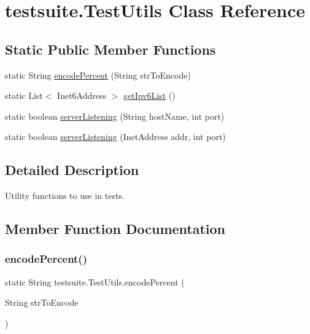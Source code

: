 \hypertarget{classtestsuite_1_1_test_utils}{}\section{testsuite.\+Test\+Utils Class Reference}
\label{classtestsuite_1_1_test_utils}
\subsection*{Static Public Member Functions}
\begin{DoxyCompactItemize}
\item 
static String \mbox{\hyperlink{classtestsuite_1_1_test_utils_aa56c16bde9485cf06427278716fc80f0}{encode\+Percent}} (String str\+To\+Encode)
\item 
static List$<$ Inet6\+Address $>$ \mbox{\hyperlink{classtestsuite_1_1_test_utils_a7b4afe11135792d356ef72338be74054}{get\+Ipv6\+List}} ()
\item 
static boolean \mbox{\hyperlink{classtestsuite_1_1_test_utils_a6a23cc4c25f5ec50a93d7735d8591f74}{server\+Listening}} (String host\+Name, int port)
\item 
static boolean \mbox{\hyperlink{classtestsuite_1_1_test_utils_a12975c2246ae1be20b9352ad1cff9460}{server\+Listening}} (Inet\+Address addr, int port)
\end{DoxyCompactItemize}


\subsection{Detailed Description}
Utility functions to use in tests. 

\subsection{Member Function Documentation}
\mbox{\label{classtestsuite_1_1_test_utils_aa56c16bde9485cf06427278716fc80f0}} 
\subsubsection{\texorpdfstring{encode\+Percent()}{encodePercent()}}
{\footnotesize\ttfamily static String testsuite.\+Test\+Utils.\+encode\+Percent (\begin{DoxyParamCaption}\item[{String}]{str\+To\+Encode }\end{DoxyParamCaption})\hspace{0.3cm}{\ttfamily [static]}}

